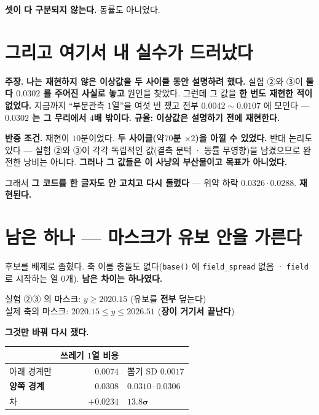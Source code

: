 \documentclass[10pt,a4paper]{article}
\newcommand{\claim}[2]{\begin{claimbox}\textbf{주장.} #1\par\smallskip
  \textcolor{gray!70}{\textbf{반증 조건.} #2}\end{claimbox}}
\begin{document}
\textbf{셋이 다 구분되지 않는다.} 동률도 아니었다.

\section{그리고 여기서 내 실수가 드러났다}

\claim{\textbf{나는 재현하지 않은 이상값을 두 사이클 동안 설명하려 했다.} 실험 ②와
③이 \textbf{둘 다 $0.0302$ 를 주어진 사실로 놓고} 원인을 찾았다. 그런데 그 값을
\textbf{한 번도 재현한 적이 없었다.} 지금까지 ``부분관측 $1$열''을 여섯 번 쟀고 전부
$0.0042 \sim 0.0107$ 에 모인다 --- \textbf{$0.0302$ 는 그 무리에서 $4$배 밖이다.}
\textbf{규율: 이상값은 설명하기 전에 재현한다.}}
{재현이 $10$분이었다. \textbf{두 사이클($약 70$분 $\times 2$)을 아낄 수 있었다.}
반대 논리도 있다 --- 실험 ②와 ③이 각각 독립적인 값(결측 문턱 · 동률 무영향)을
남겼으므로 완전한 낭비는 아니다. \textbf{그러나 그 값들은 이 사냥의 부산물이고
목표가 아니었다.}}

그래서 \textbf{그 코드를 한 글자도 안 고치고 다시 돌렸다} --- 위약 하락
$\mathbf{0.0326 \cdot 0.0288}$. \textbf{재현된다.}

\section{남은 하나 --- 마스크가 유보 안을 가른다}

후보를 배제로 좁혔다. 축 이름 충돌도 없다(\texttt{base()} 에 \texttt{field\_spread}
없음 · \texttt{field} 로 시작하는 열 $0$개). \textbf{남은 차이는 하나였다.}

\begin{center}
실험 ②③ 의 마스크: $y \geq 2020.15$ \quad (유보를 \textbf{전부} 덮는다)\\
실제 축의 마스크: $2020.15 \leq y \leq \mathbf{2026.51}$ \quad
(\textbf{장이 거기서 끝난다})
\end{center}

\textbf{그것만 바꿔 다시 쟀다.}

\begin{center}
\begin{tabular}{lrl}
\toprule
& 쓰레기 $1$열 비용 & \\
\midrule
아래 경계만 & $0.0074$ & 뽑기 SD $0.0017$ \\
\textbf{양쪽 경계} & $\mathbf{0.0308}$ & $0.0310 \cdot 0.0306$ \\
\midrule
차 & $\mathbf{+0.0234}$ & $\mathbf{13.8\sigma}$ \\
\bottomrule
\end{tabular}
\end{center}
\end{document}
